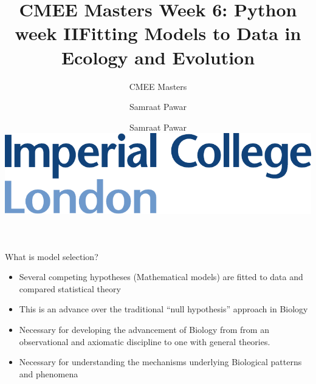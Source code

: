 \documentclass[xcolor=x11names,handout,compress]{beamer}
\title{CMEE Masters Week 6: Python week II}
\author{Samraat Pawar}
\renewcommand{\(}{\begin{columns}}
\renewcommand{\)}{\end{columns}}
\newcommand{\<}[1]{\begin{column}{#1}}
\renewcommand{\>}{\end{column}}
\begin{document}
\begin{frame}[plain]

\title{Fitting Models to Data in Ecology and Evolution}
\vspace{12pt}
\subtitle{CMEE Masters}
\author{
    Samraat Pawar\\
    \vspace{20pt}
  \centering
  \includegraphics[height = .3in]{Imperial_Color1.pdf}
}
 
\titlepage
\end{frame}

\begin{frame}{What is model selection?}

   \begin{itemize}[<+->]\itemsep12pt
		\item Several competing hypotheses (Mathematical models) are fitted to data and compared statistical theory 
		\item This is an advance over the traditional ``null hypothesis'' approach in Biology
		\item Necessary for developing the advancement of Biology from from an observational and axiomatic discipline to one with general theories.
		\item Necessary for understanding the mechanisms underlying Biological patterns and phenomena   
	 \end{itemize}

\end{frame}
\end{document}
